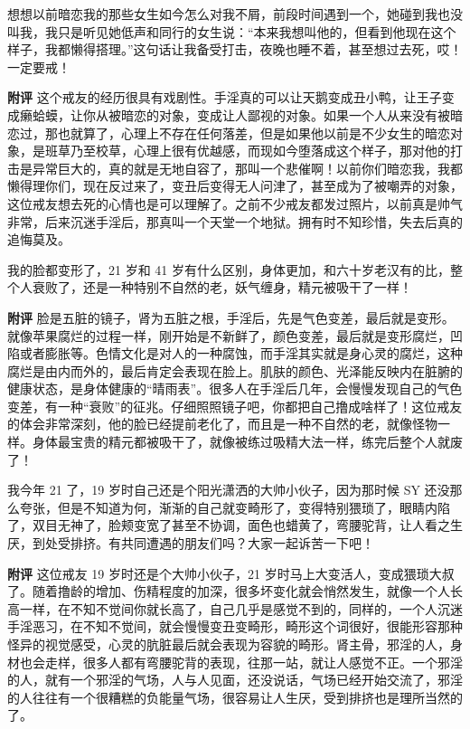 \begin{case}[变丑]
    想想以前暗恋我的那些女生如今怎么对我不屑，前段时间遇到一个，她碰到我也没叫我，我只是听见她低声和同行的女生说：“本来我想叫他的，但看到他现在这个样子，我都懒得搭理。”这句话让我备受打击，夜晚也睡不着，甚至想过去死，哎！一定要戒！

    \textbf{附评} 这个戒友的经历很具有戏剧性。手淫真的可以让天鹅变成丑小鸭，让王子变成癞蛤蟆，让你从被暗恋的对象，变成让人鄙视的对象。如果一个人从来没有被暗恋过，那也就算了，心理上不存在任何落差，但是如果他以前是不少女生的暗恋对象，是班草乃至校草，心理上很有优越感，而现如今堕落成这个样子，那对他的打击是异常巨大的，真的就是无地自容了，那叫一个悲催啊！以前你们暗恋我，我都懒得理你们，现在反过来了，变丑后变得无人问津了，甚至成为了被嘲弄的对象，这位戒友想去死的心情也是可以理解了。之前不少戒友都发过照片，以前真是帅气非常，后来沉迷手淫后，那真叫一个天堂一个地狱。拥有时不知珍惜，失去后真的追悔莫及。
\end{case}

\begin{case}[变丑]
    我的脸都变形了，21 岁和 41 岁有什么区别，身体更加，和六十岁老汉有的比，整个人衰败了，还是一种特别不自然的老，妖气缠身，精元被吸干了一样！

    \textbf{附评} 脸是五脏的镜子，肾为五脏之根，手淫后，先是气色变差，最后就是变形。就像苹果腐烂的过程一样，刚开始是不新鲜了，颜色变差，最后就是变形腐烂，凹陷或者膨胀等。色情文化是对人的一种腐蚀，而手淫其实就是身心灵的腐烂，这种腐烂是由内而外的，最后肯定会表现在脸上。肌肤的颜色、光泽能反映内在脏腑的健康状态，是身体健康的“晴雨表”。很多人在手淫后几年，会慢慢发现自己的气色变差，有一种“衰败”的征兆。仔细照照镜子吧，你都把自己撸成啥样了！这位戒友的体会非常深刻，他的脸已经提前老化了，而且是一种不自然的老，就像怪物一样。身体最宝贵的精元都被吸干了，就像被练过吸精大法一样，练完后整个人就废了！
\end{case}

\begin{case}[变丑]
    我今年 21 了，19 岁时自己还是个阳光潇洒的大帅小伙子，因为那时候 SY 还没那么夸张，但是不知道为何，渐渐的自己就变畸形了，变得特别猥琐了，眼睛内陷了，双目无神了，脸颊变宽了甚至不协调，面色也蜡黄了，弯腰驼背，让人看之生厌，到处受排挤。有共同遭遇的朋友们吗？大家一起诉苦一下吧！

    \textbf{附评} 这位戒友 19 岁时还是个大帅小伙子，21 岁时马上大变活人，变成猥琐大叔了。随着撸龄的增加、伤精程度的加深，很多坏变化就会悄然发生，就像一个人长高一样，在不知不觉间你就长高了，自己几乎是感觉不到的，同样的，一个人沉迷手淫恶习，在不知不觉间，就会慢慢变丑变畸形，畸形这个词很好，很能形容那种怪异的视觉感受，心灵的肮脏最后就会表现为容貌的畸形。肾主骨，邪淫的人，身材也会走样，很多人都有弯腰驼背的表现，往那一站，就让人感觉不正。一个邪淫的人，就有一个邪淫的气场，人与人见面，还没说话，气场已经开始交流了，邪淫的人往往有一个很糟糕的负能量气场，很容易让人生厌，受到排挤也是理所当然的了。
\end{case}

